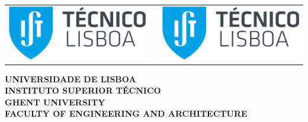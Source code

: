 \begin{center}
    \vspace*{-2.0cm}
    \setlength{\tabcolsep}{0pt}
    \begin{tabular}{>{\raggedleft}m{5cm}>{\centering}m{\dimexpr\textwidth - 10cm\relax}>{\raggedright}m{5cm}}
    \includegraphics[width=\linewidth]{includes/LogoIST.pdf}%
    &
    &%
    \includegraphics[width=\linewidth]{includes/LogoIST.pdf} %
    \end{tabular}
    \textbf{\large UNIVERSIDADE DE LISBOA} \\[5pt]%
    \textbf{\large INSTITUTO SUPERIOR TÉCNICO}\\[20pt]
    \textbf{\large GHENT UNIVERSITY} \\[5pt]%
    \textbf{\large FACULTY OF ENGINEERING AND ARCHITECTURE}%



    
    

\vspace{1.0cm}


\end{center}
